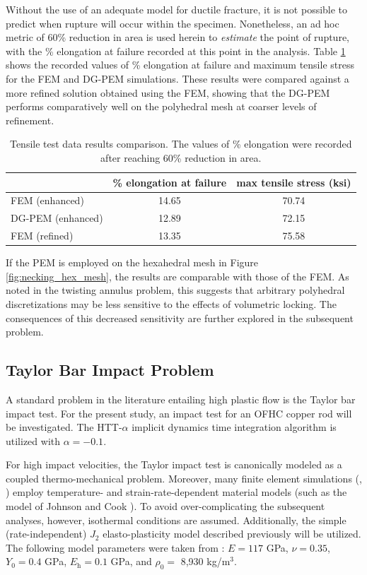 Without the use of an adequate model for ductile fracture, it is not possible to predict when rupture will occur within the specimen. Nonetheless, an ad hoc metric of 60\% reduction in area is used herein to \textit{estimate} the point of rupture, with the \% elongation at failure recorded at this point in the analysis. Table \ref{tab:tensile_test_data_results} shows the recorded values of \% elongation at failure and maximum tensile stress for the FEM and DG-PEM simulations. These results were compared against a more refined solution obtained using the FEM, showing that the DG-PEM performs comparatively well on the polyhedral mesh at coarser levels of refinement.

\begin{table}
\centering
\begin{tabular}{| l || c | c |}
    \hline
               & \% elongation at failure & max tensile stress (ksi) \\ \hline \hline
    FEM (enhanced)    & 14.65 & 70.74 \\ \hline
    DG-PEM (enhanced) & 12.89 & 72.15 \\ \hline
    FEM (refined)     & 13.35 & 75.58 \\
    \hline
\end{tabular}
\caption{Tensile test data results comparison. The values of \% elongation were recorded after reaching 60\% reduction in area.}
\label{tab:tensile_test_data_results}
\end{table}

If the PEM is employed on the hexahedral mesh in Figure \ref{fig:necking_hex_mesh}, the results are comparable with those of the FEM. As noted in the twisting annulus problem, this suggests that arbitrary polyhedral discretizations may be less sensitive to the effects of volumetric locking. The consequences of this decreased sensitivity are further explored in the subsequent problem.

\subsection*{Taylor Bar Impact Problem}

A standard problem in the literature entailing high plastic flow is the Taylor bar impact test. For the present study, an impact test for an OFHC copper rod will be investigated. The HTT-$\alpha$ implicit dynamics time integration algorithm \cite{Hilber&Hughes&Taylor:77} is utilized with $\alpha = -0.1$.

For high impact velocities, the Taylor impact test is canonically modeled as a coupled thermo-mechanical problem. Moreover, many finite element simulations (\cite{Heinstein:05}, \cite{Banerjee:05}) employ temperature- and strain-rate-dependent material models (such as the model of Johnson and Cook \cite{Johnson&Cook:83}). To avoid over-complicating the subsequent analyses, however, isothermal conditions are assumed. Additionally, the simple (rate-independent) $J_2$ elasto-plasticity model described previously will be utilized. The following model parameters were taken from \cite{Erhart:11}: $E = 117$ GPa, $\nu = 0.35$, $Y_0 = 0.4$ GPa, $E_{\mathrm h} = 0.1$ GPa, and $\rho_0=$ 8,930 kg/$\text{m}^3$.


